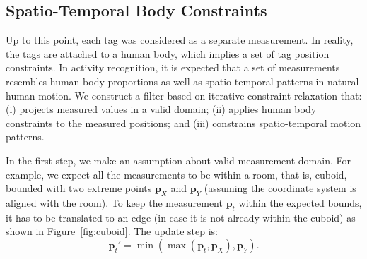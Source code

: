 




\subsection{Spatio-Temporal Body Constraints}
\label{sec:ar:noise:body}
Up to this point, each tag was considered as a separate measurement. In reality, the tags are attached to a human body, which implies a set of tag position constraints. In activity recognition, it is expected that a set of measurements resembles human body proportions as well as spatio-temporal patterns in natural human motion. We construct a filter based on iterative constraint relaxation that: (i) projects measured values in a valid domain; (ii) applies human body constraints to the measured positions; and (iii) constrains spatio-temporal motion patterns.

In the first step, we make an assumption about valid measurement domain. For example, we expect all the measurements to be within a room, that is, cuboid, bounded with two extreme points $\mathbf{p}_X$ and $\mathbf{p}_Y$ (assuming the coordinate system is aligned with the room). 
To keep the measurement $\mathbf{p}_t$ within the expected bounds, it has to be translated to an edge (in case it is not already within the cuboid) as shown in Figure~\ref{fig:cuboid}. The update step is:
\begin{equation}
\label{eq:validDomain}
\mathbf{p}_t' = \min(\max(\mathbf{p}_t, \mathbf{p}_X), \mathbf{p}_Y).
\end{equation} 


